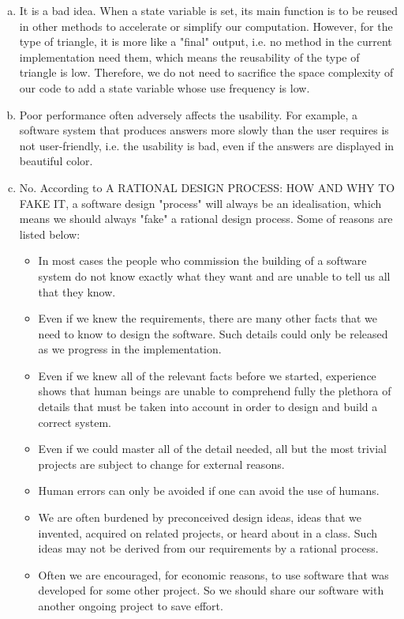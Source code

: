 \documentclass[12pt]{article}
\begin{document}
\begin{enumerate}[(a)]
\item It is a bad idea. When a state variable is set, its main function is to be reused in other methods to accelerate or simplify our computation. However, for the type of triangle, it is more like a "final" output, i.e. no method in the current implementation need them, which means the reusability of the type of triangle is low. Therefore, we do not need to 
sacrifice the space complexity of our code to add a state variable whose use frequency is low.
\item Poor performance often adversely affects the usability. For example, a software system that produces answers more slowly than the user requires is not user-friendly, i.e. the usability is bad, even if the answers are displayed in beautiful color.
\item No. According to A RATIONAL DESIGN PROCESS: HOW AND WHY TO FAKE IT, a software design "process" will always  be an idealisation, which means we should always "fake" a rational design process. Some of reasons are listed below:
\begin{itemize}
\item In most cases the people who commission the building of a software system do not know exactly what they want and are unable to tell us all that they know.
\item Even if we knew the requirements, there are many other facts that we need to know to design the software. Such details could only be released as we progress in the implementation.
\item Even if we knew all of the relevant facts before we started, experience shows that human beings are unable to comprehend fully the plethora of details that must be taken into account in order to design and build a correct system. 
\item Even if we could master all of the detail needed, all but the most trivial projects are subject to change for external reasons.
\item Human errors can only be avoided if one can avoid the use of humans.
\item We are often burdened by preconceived design ideas, ideas that we invented, acquired on related projects, or heard about in a class. Such ideas may not be derived from our requirements by a rational process.
\item Often we are encouraged, for economic reasons, to use software that was developed for some other project. So we should share our software with another ongoing project to save effort.
\end{itemize}

\end{enumerate}
\end{document}
